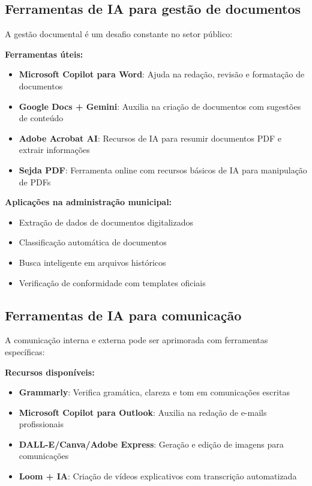 \documentclass[12pt,a4paper]{book}
\begin{document}
\subsection{Ferramentas de IA para gestão de documentos}

A gestão documental é um desafio constante no setor público:

\textbf{Ferramentas úteis:}
\begin{itemize}
    \item \textbf{Microsoft Copilot para Word}: Ajuda na redação, revisão e formatação de documentos
    \item \textbf{Google Docs + Gemini}: Auxilia na criação de documentos com sugestões de conteúdo
    \item \textbf{Adobe Acrobat AI}: Recursos de IA para resumir documentos PDF e extrair informações
    \item \textbf{Sejda PDF}: Ferramenta online com recursos básicos de IA para manipulação de PDFs
\end{itemize}

\textbf{Aplicações na administração municipal:}
\begin{itemize}
    \item Extração de dados de documentos digitalizados
    \item Classificação automática de documentos
    \item Busca inteligente em arquivos históricos
    \item Verificação de conformidade com templates oficiais
\end{itemize}

\subsection{Ferramentas de IA para comunicação}

A comunicação interna e externa pode ser aprimorada com ferramentas específicas:

\textbf{Recursos disponíveis:}
\begin{itemize}
    \item \textbf{Grammarly}: Verifica gramática, clareza e tom em comunicações escritas
    \item \textbf{Microsoft Copilot para Outlook}: Auxilia na redação de e-mails profissionais
    \item \textbf{DALL-E/Canva/Adobe Express}: Geração e edição de imagens para comunicações
    \item \textbf{Loom + IA}: Criação de vídeos explicativos com transcrição automatizada
\end{itemize}
\end{document}
